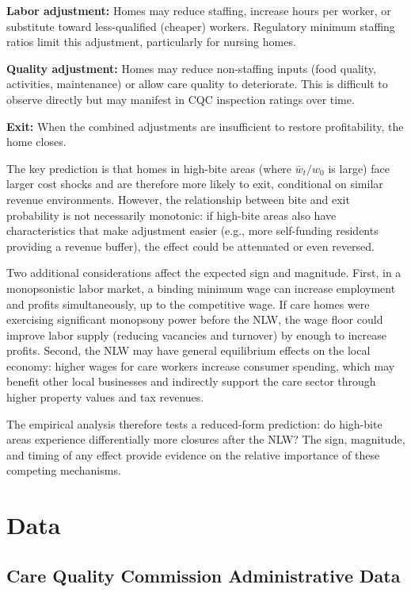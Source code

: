 \documentclass[12pt]{article}
\begin{document}
\textbf{Labor adjustment:} Homes may reduce staffing, increase hours per worker, or substitute toward less-qualified (cheaper) workers. Regulatory minimum staffing ratios limit this adjustment, particularly for nursing homes.

\textbf{Quality adjustment:} Homes may reduce non-staffing inputs (food quality, activities, maintenance) or allow care quality to deteriorate. This is difficult to observe directly but may manifest in CQC inspection ratings over time.

\textbf{Exit:} When the combined adjustments are insufficient to restore profitability, the home closes.

The key prediction is that homes in high-bite areas (where $\bar{w}_t / w_0$ is large) face larger cost shocks and are therefore more likely to exit, conditional on similar revenue environments. However, the relationship between bite and exit probability is not necessarily monotonic: if high-bite areas also have characteristics that make adjustment easier (e.g., more self-funding residents providing a revenue buffer), the effect could be attenuated or even reversed.

Two additional considerations affect the expected sign and magnitude. First, in a monopsonistic labor market, a binding minimum wage can increase employment and profits simultaneously, up to the competitive wage. If care homes were exercising significant monopsony power before the NLW, the wage floor could improve labor supply (reducing vacancies and turnover) by enough to increase profits. Second, the NLW may have general equilibrium effects on the local economy: higher wages for care workers increase consumer spending, which may benefit other local businesses and indirectly support the care sector through higher property values and tax revenues.

The empirical analysis therefore tests a reduced-form prediction: do high-bite areas experience differentially more closures after the NLW? The sign, magnitude, and timing of any effect provide evidence on the relative importance of these competing mechanisms.


\section{Data}
\label{sec:data}

\subsection{Care Quality Commission Administrative Data}
\end{document}
